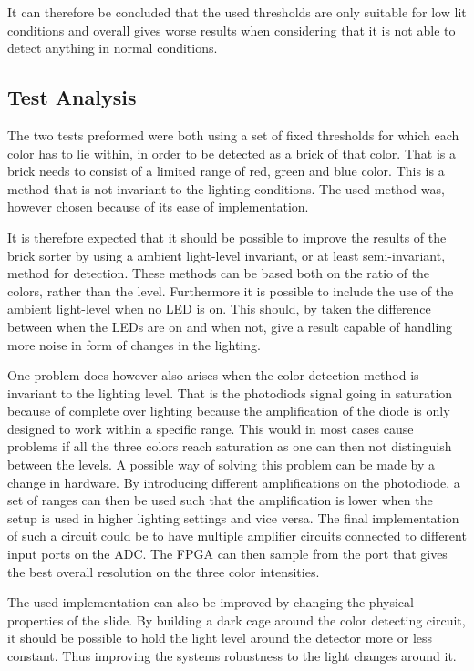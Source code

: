 It can therefore be concluded that the used thresholds are only suitable for low lit conditions and overall gives worse results when considering that it is not able to detect anything in normal conditions.



\subsection{Test Analysis}

The two tests preformed were both using a set of fixed thresholds for which each color has to lie within, in order to be detected as a brick of that color.
That is a brick needs to consist of a limited range of red, green and blue color.
This is a method that is not invariant to the lighting conditions.
The used method was, however chosen because of its ease of implementation.

It is therefore expected that it should be possible to improve the results of the brick sorter by using a ambient light-level invariant, or at least semi-invariant, method for detection.
These methods can be based both on the ratio of the colors, rather than the level.
Furthermore it is possible to include the use of the ambient light-level when no LED is on.
This should, by taken the difference between when the LEDs are on and when not, give a result capable of handling more noise in form of changes in the lighting.

One problem does however also arises when the color detection method is invariant to the lighting level.
That is the photodiods signal going in saturation because of complete over lighting because the amplification of the diode is only designed to work within a specific range.
This would in most cases cause problems if all the three colors reach saturation as one can then not distinguish between the levels.
A possible way of solving this problem can be made by a change in hardware.
By introducing different amplifications on the photodiode, a set of ranges can then be used such that the amplification is lower when the setup is used in higher lighting settings and vice versa.
The final implementation of such a circuit could be to have multiple amplifier circuits connected to different input ports on the ADC.
The FPGA can then sample from the port that gives the best overall resolution on the three color intensities.

The used implementation can also be improved by changing the physical properties of the slide.
By building a dark cage around the color detecting circuit, it should be possible to hold the light level around the detector more or less constant.
Thus improving the systems robustness to the light changes around it.




